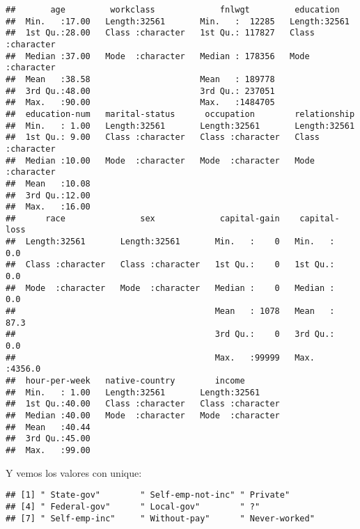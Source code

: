 \documentclass[]{article}
\newenvironment{Shaded}{\begin{snugshade}}{\end{snugshade}}
\newcommand{\KeywordTok}[1]{\textcolor[rgb]{0.13,0.29,0.53}{\textbf{#1}}}
\newcommand{\NormalTok}[1]{#1}
\newcommand{\OperatorTok}[1]{\textcolor[rgb]{0.81,0.36,0.00}{\textbf{#1}}}
\begin{document}
\begin{verbatim}
##       age         workclass             fnlwgt         education        
##  Min.   :17.00   Length:32561       Min.   :  12285   Length:32561      
##  1st Qu.:28.00   Class :character   1st Qu.: 117827   Class :character  
##  Median :37.00   Mode  :character   Median : 178356   Mode  :character  
##  Mean   :38.58                      Mean   : 189778                     
##  3rd Qu.:48.00                      3rd Qu.: 237051                     
##  Max.   :90.00                      Max.   :1484705                     
##  education-num   marital-status      occupation        relationship      
##  Min.   : 1.00   Length:32561       Length:32561       Length:32561      
##  1st Qu.: 9.00   Class :character   Class :character   Class :character  
##  Median :10.00   Mode  :character   Mode  :character   Mode  :character  
##  Mean   :10.08                                                           
##  3rd Qu.:12.00                                                           
##  Max.   :16.00                                                           
##      race               sex             capital-gain    capital-loss   
##  Length:32561       Length:32561       Min.   :    0   Min.   :   0.0  
##  Class :character   Class :character   1st Qu.:    0   1st Qu.:   0.0  
##  Mode  :character   Mode  :character   Median :    0   Median :   0.0  
##                                        Mean   : 1078   Mean   :  87.3  
##                                        3rd Qu.:    0   3rd Qu.:   0.0  
##                                        Max.   :99999   Max.   :4356.0  
##  hour-per-week   native-country        income         
##  Min.   : 1.00   Length:32561       Length:32561      
##  1st Qu.:40.00   Class :character   Class :character  
##  Median :40.00   Mode  :character   Mode  :character  
##  Mean   :40.44                                        
##  3rd Qu.:45.00                                        
##  Max.   :99.00
\end{verbatim}

Y vemos los valores con unique:

\begin{Shaded}
\end{Shaded}

\begin{verbatim}
## [1] " State-gov"        " Self-emp-not-inc" " Private"         
## [4] " Federal-gov"      " Local-gov"        " ?"               
## [7] " Self-emp-inc"     " Without-pay"      " Never-worked"
\end{verbatim}
\end{document}
